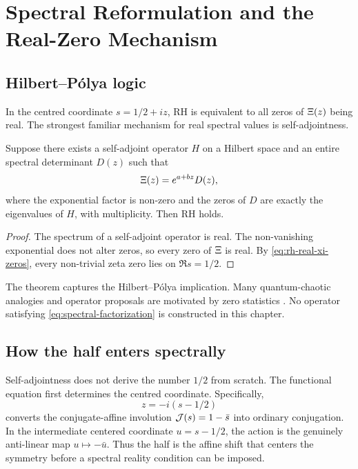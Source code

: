 \chapter{Spectral Reformulation and the Real-Zero Mechanism}
\label{chap:spectral}

\section{Hilbert--P\'olya logic}

In the centred coordinate $s=1/2+iz$, RH is equivalent to all zeros of $\Xi(z)$ being real. The strongest familiar mechanism for real spectral values is self-adjointness.

\begin{theorem}
\label{thm:spectral-conditional}
Suppose there exists a self-adjoint operator $H$ on a Hilbert space and an entire spectral determinant $D(z)$ such that
\begin{equation}
 \Xi(z)=e^{a+bz}D(z),
 \label{eq:spectral-factorization}
\end{equation}
where the exponential factor is non-zero and the zeros of $D$ are exactly the eigenvalues of $H$, with multiplicity. Then RH holds.
\end{theorem}
\begin{proof}
The spectrum of a self-adjoint operator is real. The non-vanishing exponential does not alter zeros, so every zero of $\Xi$ is real. By \cref{eq:rh-real-xi-zeros}, every non-trivial zeta zero lies on $\Re s=1/2$.
\end{proof}

The theorem captures the Hilbert--P\'olya implication. Many quantum-chaotic analogies and operator proposals are motivated by zero statistics \citep{montgomery1973,odlyzko1987,berrykeating1999,keatingsnaith2000}. No operator satisfying \cref{eq:spectral-factorization} is constructed in this chapter.

\section{How the half enters spectrally}

Self-adjointness does not derive the number $1/2$ from scratch. The functional equation first determines the centred coordinate. Specifically,
\[
 z=-i(s-1/2)
\]
converts the conjugate-affine involution $\mathcal{J}(s)=1-\bar s$ into ordinary conjugation. In the intermediate centered coordinate $u=s-1/2$, the action is the genuinely anti-linear map $u\mapsto-\bar u$. Thus the half is the affine shift that centers the symmetry before a spectral reality condition can be imposed.

